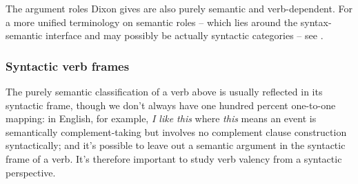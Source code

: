 \documentclass[a4paper, oneside]{report}
\newcommand*{\citesec}[1]{\S~{#1}}
\newcommand{\corpus}[1]{\emph{#1}}
\begin{document}
The argument roles Dixon gives are also purely semantic and verb-dependent.
For a more unified terminology on semantic roles
-- which lies around the syntax-semantic interface 
and may possibly be actually syntactic categories --
see \citet[\citesec{4.2}]{cgel}.

\subsubsection{Syntactic verb frames}

The purely semantic classification of a verb above 
is usually reflected in its syntactic frame,
though we don't always have one hundred percent one-to-one mapping:
in English, for example, \corpus{I like this} 
where \corpus{this} means an event 
is semantically complement-taking 
but involves no complement clause construction syntactically;
and it's possible to leave out a semantic argument in the syntactic frame of a verb.
It's therefore important to study verb valency from a syntactic perspective.
\end{document}
